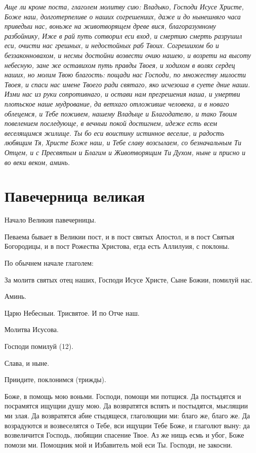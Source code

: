 \itshape Аще ли кроме поста, глаголем молитву сию:\normalfont{} Владыко, Господи Исусе Христе, Боже наш, долготерпеливе о наших согрешениих, даже и до нынешняго часа приведыи нас, воньже на животворящем древе вися, благоразумному разбойнику, Иже в рай путь сотворил еси вход, и смертию смерть разрушил еси, очисти нас грешных, и недостойных раб Твоих. Согрешихом бо и беззаконновахом, и несмы достойни возвести очию нашею, и возрети на высоту небесную, зане же оставихом путь правды Твоея, и ходихом в волях сердец наших, но молим Твою благость: пощади нас Господи, по множеству милости Твоея, и спаси нас имене Твоего ради святаго, яко исчезоша в суете дние наши. Изми нас из руки сопротивнаго, и остави нам прегрешения наша, и умертви плотьское наше мудрование, да ветхаго отложивше человека, и в новаго облецемся, и Тебе поживем, нашему Владыце и Благодателю, и тако Твоим повелением последующе, в вечныи покой достигнем, идеже есть всем веселящимся жилище. Ты бо еси воистину истинное веселие, и радость любящим Тя, Христе Боже наш, и Тебе славу возсылаем, со безначальным Ти Отцем, и с Пресвятым и Благим и Животворящим Ти Духом, ныне и присно и во веки веком, аминь.


\section{Павечерница великая}
 


Начало Великия павечерницы. 

Певаема бывает в Великии пост, и в пост святых Апостол, и в пост Святыя Богородицы, и в пост Рожества Христова, егда есть Аллилуия, с поклоны.

По обычнем начале глаголем:

За молитв святых отец наших, Господи Исусе Христе, Сыне Божии, помилуй нас.

Аминь.

Царю Небесныи. Трисвятое. И по Отче наш. 

Молитва Исусова. 

Господи помилуй (12).

Слава, и ныне. 

Приидите, поклонимся (трижды).




Боже, в помощь мою воньми. Господи, помощи ми потщися. Да постыдятся и посрамятся ищущии душу мою. Да возвратятся вспять и постыдятся, мыслящии ми злая. Да возвратятся абие стыдящеся, глаголющии ми: благо же, благо же. Да возрадуются и возвеселятся о Тебе, вси ищущии Тебе Боже, и глаголют выну: да возвеличится Господь, любящии спасение Твое. Аз же нищь есмь и убог, Боже помози ми. Помощник мой и Избавитель мой еси Ты. Господи, не закосни.


